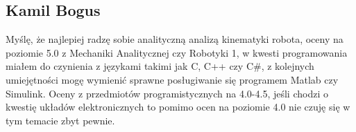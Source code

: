 \subsection{Kamil Bogus}
Myślę, że najlepiej radzę sobie analityczną analizą kinematyki robota, oceny na poziomie 5.0 z Mechaniki Analitycznej czy Robotyki 1, w kwesti programowania miałem do czynienia z językami takimi jak C, C++ czy C#, z kolejnych umiejętności mogę wymienić sprawne posługiwanie się programem Matlab czy Simulink. Oceny z przedmiotów programistycznych na 4.0-4.5, jeśli chodzi o kwestię układów elektronicznych to pomimo ocen na poziomie 4.0 nie czuję się w tym temacie zbyt pewnie.
